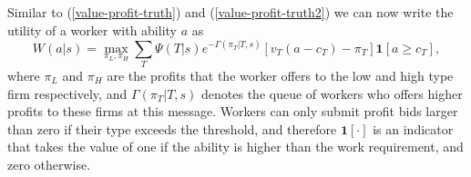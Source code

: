 \documentclass[12pt]{article}
\begin{document}
Similar to (\ref{value-profit-truth}) and (\ref{value-profit-truth2}) we can
now write the utility of a worker with ability $a$ as%
\begin{equation}
W(a|s)=\max_{\pi _{L},\pi _{H}}\sum_{T}\Psi (T|s)e^{-\Gamma (\pi _{T}|T,s)} 
\left[ v_{T}(a-c_{T})-\pi _{T}\right] \boldsymbol{1}[a\geq c_{T}],
\label{objective-babbling}
\end{equation}%
where $\pi _{L}$ and $\pi _{H}$ are the profits that the worker offers to
the low and high type firm respectively, and $\Gamma (\pi _{T}|T,s)$ denotes
the queue of workers who offers higher profits to these firms at this
message. Workers can only submit profit bids larger than zero if their type
exceeds the threshold, and therefore $\boldsymbol{1[\cdot ]}$ is an
indicator that takes the value of one if the ability is higher than the work
requirement, and zero otherwise.
\end{document}
